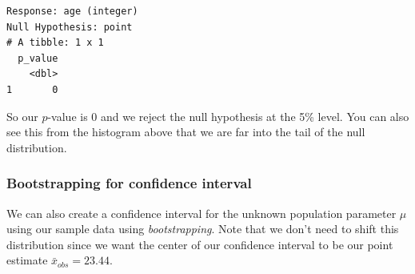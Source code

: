 \documentclass[12pt,]{krantz}
\makeatletter
\newenvironment{Shaded}{\begin{snugshade}}{\end{snugshade}}
\newcommand{\KeywordTok}[1]{\textcolor[rgb]{0.27,0.27,0.27}{\textbf{#1}}}
\newcommand{\DataTypeTok}[1]{\textcolor[rgb]{0.27,0.27,0.27}{#1}}
\newcommand{\DecValTok}[1]{\textcolor[rgb]{0.06,0.06,0.06}{#1}}
\newcommand{\StringTok}[1]{\textcolor[rgb]{0.5,0.5,0.5}{#1}}
\newcommand{\OperatorTok}[1]{\textcolor[rgb]{0.43,0.43,0.43}{\textbf{#1}}}
\newcommand{\NormalTok}[1]{#1}
\newenvironment{kframe}{%
\medskip{}
\setlength{\fboxsep}{.8em}
 \def\at@end@of@kframe{}%
 \ifinner\ifhmode%
  \def\at@end@of@kframe{\end{minipage}}%
  \begin{minipage}{\columnwidth}%
 \fi\fi%
 \def\FrameCommand##1{\hskip\@totalleftmargin \hskip-\fboxsep
 \colorbox{shadecolor}{##1}\hskip-\fboxsep
     \hskip-\linewidth \hskip-\@totalleftmargin \hskip\columnwidth}%
 \MakeFramed {\advance\hsize-\width
   \@totalleftmargin\z@ \linewidth\hsize
   \@setminipage}}%
 {\par\unskip\endMakeFramed%
 \at@end@of@kframe}
\renewenvironment{Shaded}{\begin{kframe}}{\end{kframe}}
\makeatother
\begin{document}
\begin{Shaded}
\end{Shaded}

\begin{verbatim}
Response: age (integer)
Null Hypothesis: point
# A tibble: 1 x 1
  p_value
    <dbl>
1       0
\end{verbatim}

So our \(p\)-value is 0 and we reject the null hypothesis at the 5\%
level. You can also see this from the histogram above that we are far
into the tail of the null distribution.

\subsubsection*{Bootstrapping for confidence
interval}\label{bootstrapping-for-confidence-interval}

We can also create a confidence interval for the unknown population
parameter \(\mu\) using our sample data using \emph{bootstrapping}. Note
that we don't need to shift this distribution since we want the center
of our confidence interval to be our point estimate
\(\bar{x}_{obs} = 23.44\).

\begin{Shaded}
\end{Shaded}

\begin{Shaded}
\end{Shaded}
\end{document}
